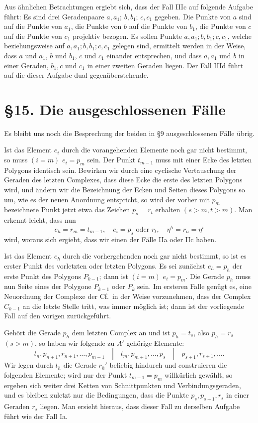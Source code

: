 \documentclass[11pt]{article}
\newcommand{\Cf}{\textup{Cf.}}
\begin{document}
Aus ähnlichen Betrachtungen ergiebt sich, dass der Fall IIIc auf folgende Aufgabe führt: Es sind drei Geradenpaare $a,a_1$; $b,b_1$; $c,c_1$ gegeben. Die Punkte von $a$ sind auf die Punkte von $a_1$, die Punkte von $b$ auf die Punkte von $b_1$, die Punkte von $c$ auf die Punkte von $c_1$ projektiv bezogen. Es sollen Punkte $a,a_1;b,b_1;c,c_1$, welche beziehungsweise auf $a,a_1;b,b_1;c,c_1$ gelegen sind, ermittelt werden in der Weise, dass $a$ und $a_1$, $b$ und $b_1$, $c$ und $c_1$ einander entsprechen, und dass $a,a_1$ und $b$ in einer Geraden, $b_1,c$ und $c_1$ in einer zweiten Geraden liegen. Der Fall IIId führt auf die dieser Aufgabe dual gegenüberstehende.

\section*{\S 15. Die ausgeschlossenen Fälle}
Es bleibt uns noch die Besprechung der beiden in \S 9 ausgeschlossenen Fälle übrig.

Ist das Element $e_i$ durch die vorangehenden Elemente noch gar nicht bestimmt, so muss $(i=m)$ $e_i=p_m$ sein. Der Punkt $t_{m-1}$ muss mit einer Ecke des letzten Polygons identisch sein. Bewirken wir durch eine cyclische Vertauschung der Geraden des letzten Complexes, dass diese Ecke die erste des letzten Polygons wird, und ändern wir die Bezeichnung der Ecken und Seiten dieses Polygons so um, wie es der neuen Anordnung entspricht, so wird der vorher mit $p_m$ bezeichnete Punkt jetzt etwa das Zeichen $p_s=r_t$ erhalten $(s>m,t>m)$. Man erkennt leicht, dass nun
\[
e_h=r_m=t_{m-1},
\quad e_i=p_s\text{ oder }r_t,
\quad \eta^h=r_n=\eta^i
\]
wird, woraus sich ergiebt, dass wir einen der Fälle IIa oder IIc haben.

Ist das Element $e_h$ durch die vorhergehenden noch gar nicht bestimmt, so ist es erster Punkt des vorletzten oder letzten Polygons. Es sei zunächst $e_h=p_h$ der erste Punkt des Polygons $P_{k-1}$; dann ist $(i=m)$ $e_i=p_m$. Die Gerade $p_h$ muss nun Seite eines der Polygone $P_{k-1}$ oder $P_k$ sein. Im ersteren Falle genügt es, eine Neuordnung der Complexe der \Cf\ in der Weise vorzunehmen, dass der Complex $C_{k-1}$ an die letzte Stelle tritt, was immer möglich ist; dann ist der vorliegende Fall auf den vorigen zurückgeführt.

Gehört die Gerade $p_h$ dem letzten Complex an und ist $p_h=t_s$, also $p_h=r_s$ $(s>m)$, so haben wir folgende zu $A'$ gehörige Elemente:
\[
t_n,p_{n+1},r_{n+1},\ldots,p_{m-1}
\quad |\quad
 t_m,p_{m+1},\ldots,p_s
\quad |\quad
p_{s+1},r_{s+1},\ldots .
\]
Wir legen durch $t_h$ die Gerade $r_h'$ beliebig hindurch und construieren die folgenden Elemente; wird nur der Punkt $t_{m-1}=p_m$ willkürlich gewählt, so ergeben sich weiter drei Ketten von Schnittpunkten und Verbindungsgeraden, und es bleiben zuletzt nur die Bedingungen, dass die Punkte $p_s,p_{s+1},r_s$ in einer Geraden $r_s$ liegen. Man ersieht hieraus, dass dieser Fall zu derselben Aufgabe führt wie der Fall Ia.
\end{document}
